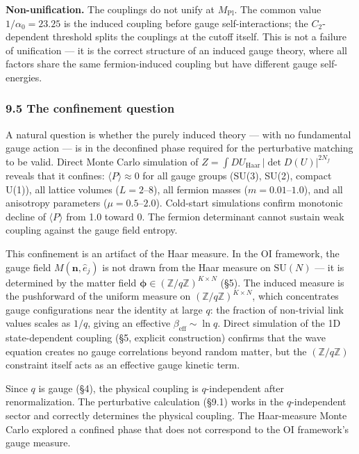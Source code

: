 \documentclass[
  11pt,
]{article}
\begin{document}
\textbf{Non-unification.} The couplings do not unify at
\(M_{\text{Pl}}\). The common value \(1/\alpha_0 = 23.25\) is the
induced coupling before gauge self-interactions; the \(C_2\)-dependent
threshold splits the couplings at the cutoff itself. This is not a
failure of unification --- it is the correct structure of an induced
gauge theory, where all factors share the same fermion-induced coupling
but have different gauge self-energies.

\hypertarget{the-confinement-question}{%
\subsubsection{9.5 The confinement
question}\label{the-confinement-question}}

A natural question is whether the purely induced theory --- with no
fundamental gauge action --- is in the deconfined phase required for the
perturbative matching to be valid. Direct Monte Carlo simulation of
\(Z = \int DU_{\text{Haar}} \, |\det D(U)|^{2N_f}\) reveals that it
confines: \(\langle P \rangle \approx 0\) for all gauge groups (SU(3),
SU(2), compact U(1)), all lattice volumes (\(L = 2\)--\(8\)), all
fermion masses (\(m = 0.01\)--\(1.0\)), and all anisotropy parameters
(\(\mu = 0.5\)--\(2.0\)). Cold-start simulations confirm monotonic
decline of \(\langle P \rangle\) from 1.0 toward 0. The fermion
determinant cannot sustain weak coupling against the gauge field
entropy.

This confinement is an artifact of the Haar measure. In the OI
framework, the gauge field \(M(\mathbf{n}, \hat{e}_j)\) is not drawn
from the Haar measure on \(\mathrm{SU}(N)\) --- it is determined by the
matter field
\(\boldsymbol{\phi} \in (\mathbb{Z}/q\mathbb{Z})^{K \times N}\) (§5).
The induced measure is the pushforward of the uniform measure on
\((\mathbb{Z}/q\mathbb{Z})^{K \times N}\), which concentrates gauge
configurations near the identity at large \(q\): the fraction of
non-trivial link values scales as \(1/q\), giving an effective
\(\beta_{\text{eff}} \sim \ln q\). Direct simulation of the 1D
state-dependent coupling (§5, explicit construction) confirms that the
wave equation creates no gauge correlations beyond random matter, but
the \((\mathbb{Z}/q\mathbb{Z})\) constraint itself acts as an effective
gauge kinetic term.

Since \(q\) is gauge (§4), the physical coupling is \(q\)-independent
after renormalization. The perturbative calculation (§9.1) works in the
\(q\)-independent sector and correctly determines the physical coupling.
The Haar-measure Monte Carlo explored a confined phase that does not
correspond to the OI framework's gauge measure.
\end{document}
